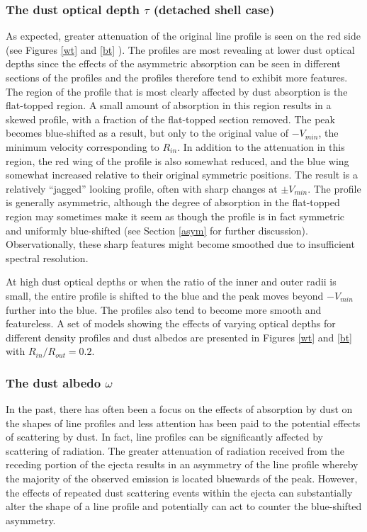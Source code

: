 \documentclass[useAMS,usenatbib,usegraphicx]{mnras}
\begin{document}
\subsubsection{The dust optical depth $\tau$ (detached shell case)}
\label{tau}

As expected, greater attenuation of the original line profile is seen on 
the red side (see Figures \ref{wt} and \ref{bt} ).  The profiles are most revealing at lower 
dust optical depths since the effects of the asymmetric absorption can be seen in 
different sections of the profiles and the profiles therefore tend to exhibit more features.
  The region of the profile that is 
most clearly affected by dust absorption is the flat-topped region.  A 
small amount of absorption in this region results in a skewed profile, 
with a fraction of the flat-topped section removed.  The peak becomes 
blue-shifted as a result, but only to the original value of $-V_{min}$, the minimum 
velocity corresponding to $R_{in}$. In addition to the attenuation in this region, 
the red wing of the profile is also somewhat reduced, and the blue wing 
somewhat increased relative to their original symmetric positions.  The 
result is a relatively ``jagged'' looking profile, often with sharp changes 
at $\pm V_{min}$.  The profile is generally asymmetric, although the 
degree of absorption in the flat-topped region may sometimes make it seem 
as though the profile is in fact symmetric and uniformly blue-shifted (see 
Section \ref{asym} for further discussion).  Observationally, these sharp features might become smoothed due to insufficient spectral resolution.

At high dust optical depths or when the ratio of the inner and outer radii is small, the entire profile is shifted to the blue and the 
peak moves beyond $-V_{min}$ further into the blue.  The 
profiles also tend to become more smooth and featureless.  A set of models showing 
the effects of varying optical depths for different density profiles and 
dust albedos are presented in Figures \ref{wt} and \ref{bt}  with $R_{in}/R_{out} = 0.2$.



\subsubsection{The dust albedo $\omega$}
\label{omega}



In the past, there has often been a focus on the effects of absorption by dust 
on the shapes of line profiles and less attention has been paid to the 
potential effects of scattering by dust.  In fact, line profiles 
can be significantly affected by scattering of radiation.  
The greater attenuation of radiation received from the receding portion of 
the ejecta results in an asymmetry of the line profile whereby the 
majority of the observed emission is located bluewards of the peak.  
However, the effects of repeated dust scattering events within the 
ejecta can substantially alter the shape of a line profile and potentially can act to counter the blue-shifted asymmetry.  
\end{document}
